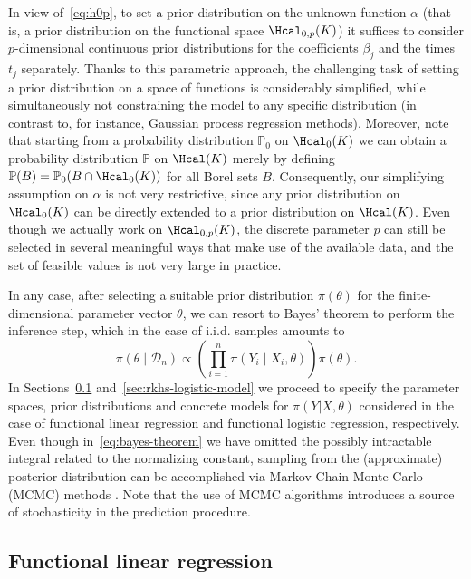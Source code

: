 In view of~\eqref{eq:h0p}, to set a prior distribution on the unknown function \(\alpha\) (that is, a prior distribution on the functional space \(\Hcal_{0,p}(K)\)) it suffices to consider \(p\)-dimensional continuous prior distributions for the coefficients \(\beta_j\) and the times \(t_j\) separately. Thanks to this parametric approach, the challenging task of setting a prior distribution on a space of functions is considerably simplified, while simultaneously not constraining the model to any specific distribution (in contrast to, for instance, Gaussian process regression methods). Moreover, note that starting from a probability distribution \(\mathbb{P}_0\) on \(\Hcal_0(K)\) we can obtain a probability distribution \(\mathbb{P}\) on \(\Hcal(K)\) merely by defining \(\mathbb{P}(B) = \mathbb{P}_0(B\cap \Hcal_0(K))\) for all Borel sets \(B\). Consequently, our simplifying assumption on \(\alpha\) is not very restrictive, since any prior distribution on \(\Hcal_0(K)\) can be directly extended to a prior distribution on \(\Hcal(K)\). Even though we actually work on \(\Hcal_{0,p}(K)\), the discrete parameter \(p\) can still be selected in several meaningful ways that make use of the available data, and the set of feasible values is not very large in practice.

In any case, after selecting a suitable prior distribution \(\pi(\theta)\) for the finite-dimensional parameter vector \(\theta\), we can resort to Bayes' theorem to perform the inference step, which in the case of i.i.d. samples amounts to
\begin{equation}\label{eq:bayes-theorem}
  \pi(\theta \mid \mathcal D_n) \propto \left( \prod_{i=1}^n \pi(Y_i\mid X_i, \theta) \right)\pi(\theta).
\end{equation}
In Sections~\ref{sec:rkhs-linear-model} and~\ref{sec:rkhs-logistic-model} we proceed to specify the parameter spaces, prior distributions and concrete models for \(\pi(Y | X,\theta)\) considered in the case of functional linear regression and functional logistic regression, respectively. Even though in~\eqref{eq:bayes-theorem} we have omitted the possibly intractable integral related to the normalizing constant, sampling from the (approximate) posterior distribution can be accomplished via Markov Chain Monte Carlo (MCMC) methods \citep[e.g.][]{brooks2011handbook}. Note that the use of MCMC algorithms introduces a source of stochasticity in the prediction procedure.

\subsection{Functional linear regression}\label{sec:rkhs-linear-model}

